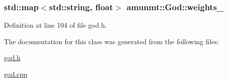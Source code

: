 \subsubsection[{\texorpdfstring{weights\+\_\+}{weights_}}]{\setlength{\rightskip}{0pt plus 5cm}std\+::map$<$std\+::string, float$>$ amunmt\+::\+God\+::weights\+\_\+\hspace{0.3cm}{\ttfamily [private]}}\hypertarget{classamunmt_1_1God_a45d56b77d799c8c15e0f2af351fdf212}{}\label{classamunmt_1_1God_a45d56b77d799c8c15e0f2af351fdf212}


Definition at line 104 of file god.\+h.



The documentation for this class was generated from the following files\+:\begin{DoxyCompactItemize}
\item 
\hyperlink{god_8h}{god.\+h}\item 
\hyperlink{god_8cpp}{god.\+cpp}\end{DoxyCompactItemize}
